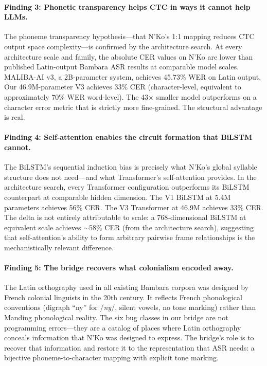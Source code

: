 \documentclass[11pt]{article}
\begin{document}
\paragraph{Finding 3: Phonetic transparency helps CTC in ways it cannot help LLMs.}
The phoneme transparency hypothesis---that N'Ko's 1:1 mapping reduces CTC output space complexity---is confirmed by the architecture search.
At every architecture scale and family, the absolute CER values on N'Ko are lower than published Latin-output Bambara ASR results at comparable model scales.
MALIBA-AI v3, a 2B-parameter system, achieves 45.73\% WER on Latin output.
Our 46.9M-parameter V3 achieves 33\% CER (character-level, equivalent to approximately 70\% WER word-level).
The 43$\times$ smaller model outperforms on a character error metric that is strictly more fine-grained.
The structural advantage is real.

\paragraph{Finding 4: Self-attention enables the circuit formation that BiLSTM cannot.}
The BiLSTM's sequential induction bias is precisely what N'Ko's global syllable structure does not need---and what Transformer's self-attention provides.
In the architecture search, every Transformer configuration outperforms its BiLSTM counterpart at comparable hidden dimension.
The V1 BiLSTM at 5.4M parameters achieves 56\% CER.
The V3 Transformer at 46.9M achieves 33\% CER.
The delta is not entirely attributable to scale: a 768-dimensional BiLSTM at equivalent scale achieves ${\sim}$58\% CER (from the architecture search), suggesting that self-attention's ability to form arbitrary pairwise frame relationships is the mechanistically relevant difference.

\paragraph{Finding 5: The bridge recovers what colonialism encoded away.}
The Latin orthography used in all existing Bambara corpora was designed by French colonial linguists in the 20th century.
It reflects French phonological conventions (digraph ``ny'' for /\textit{ny}/, silent vowels, no tone marking) rather than Manding phonological reality.
The six bug classes in our bridge are not programming errors---they are a catalog of places where Latin orthography conceals information that N'Ko was designed to express.
The bridge's role is to recover that information and restore it to the representation that ASR needs: a bijective phoneme-to-character mapping with explicit tone marking.
\end{document}
